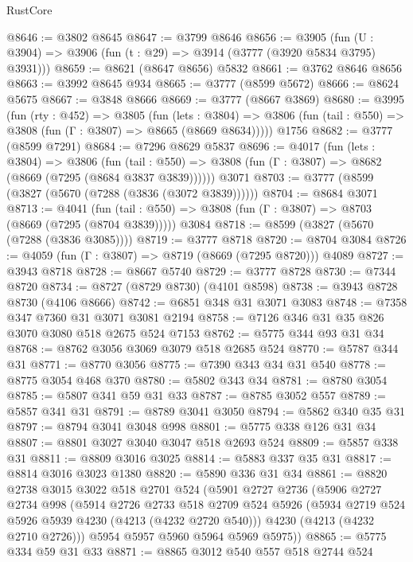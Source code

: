 \begin{lexlean}{RustCore}
\begin{coremodule}
@8646 := @3802 @8645
@8647 := @3799 @8646
@8656 := @3905 (fun (U : @3904) => @3906 (fun (t : @29) => @3914 (@3777 (@3920 @5834 @3795) @3931)))
@8659 := @8621 (@8647 @8656) @5832
@8661 := @3762 @8646 @8656
@8663 := @3992 @8645 @934
@8665 := @3777 (@8599 @5672)
@8666 := @8624 @5675
@8667 := @3848 @8666
@8669 := @3777 (@8667 @3869)
@8680 := @3995
    (fun (rty : @452) =>
    @3805
      (fun (lets : @3804) =>
      @3806 (fun (tail : @550) => @3808 (fun (Γ : @3807) => @8665 (@8669 @8634)))))
    @1756
@8682 := @3777 (@8599 @7291)
@8684 := @7296 @8629 @5837
@8696 := @4017
    (fun (lets : @3804) =>
    @3806
      (fun (tail : @550) => @3808 (fun (Γ : @3807) => @8682 (@8669 (@7295 (@8684 @3837 @3839))))))
    @3071
@8703 := @3777 (@8599 (@3827 (@5670 (@7288 (@3836 (@3072 @3839))))))
@8704 := @8684 @3071
@8713 := @4041
    (fun (tail : @550) => @3808 (fun (Γ : @3807) => @8703 (@8669 (@7295 (@8704 @3839)))))
    @3084
@8718 := @8599 (@3827 (@5670 (@7288 (@3836 @3085))))
@8719 := @3777 @8718
@8720 := @8704 @3084
@8726 := @4059 (fun (Γ : @3807) => @8719 (@8669 (@7295 @8720))) @4089
@8727 := @3943 @8718
@8728 := @8667 @5740
@8729 := @3777 @8728
@8730 := @7344 @8720
@8734 := @8727 (@8729 @8730) (@4101 @8598)
@8738 := @3943 @8728 @8730 (@4106 @8666)
@8742 := @6851 @348 @31 @3071 @3083
@8748 := @7358 @347 @7360 @31 @3071 @3081 @2194
@8758 := @7126 @346 @31 @35 @826 @3070 @3080 @518 @2675 @524 @7153
@8762 := @5775 @344 @93 @31 @34
@8768 := @8762 @3056 @3069 @3079 @518 @2685 @524
@8770 := @5787 @344 @31
@8771 := @8770 @3056
@8775 := @7390 @343 @34 @31 @540
@8778 := @8775 @3054 @468 @370
@8780 := @5802 @343 @34
@8781 := @8780 @3054
@8785 := @5807 @341 @59 @31 @33
@8787 := @8785 @3052 @557
@8789 := @5857 @341 @31
@8791 := @8789 @3041 @3050
@8794 := @5862 @340 @35 @31
@8797 := @8794 @3041 @3048 @998
@8801 := @5775 @338 @126 @31 @34
@8807 := @8801 @3027 @3040 @3047 @518 @2693 @524
@8809 := @5857 @338 @31
@8811 := @8809 @3016 @3025
@8814 := @5883 @337 @35 @31
@8817 := @8814 @3016 @3023 @1380
@8820 := @5890 @336 @31 @34
@8861 := @8820
    @2738
    @3015
    @3022
    @518
    @2701
    @524
    (@5901
      @2727
      @2736
      (@5906
        @2727
        @2734
        @998
        (@5914
          @2726
          @2733
          @518
          @2709
          @524
          @5926
          (@5934 @2719 @524 @5926 @5939 @4230 (@4213 (@4232 @2720 @540)))
          @4230
          (@4213 (@4232 @2710 @2726)))
        @5954
        @5957
        @5960
        @5964
        @5969
        @5975))
@8865 := @5775 @334 @59 @31 @33
@8871 := @8865 @3012 @540 @557 @518 @2744 @524

\end{coremodule}
\end{lexlean}

